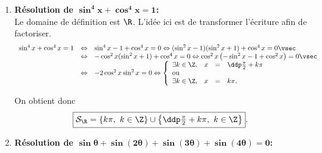 
\begin{correction}  \;
\begin{enumerate}
 \item \textbf{R\'esolution de $\mathbf{ \sin^4{x}+\cos^4{x}=1 }$:}\\
\noindent 
Le domaine de d\'efinition est $\R$. L'id\'ee ici est de transformer l'\'ecriture afin de factoriser. 
$$\begin{array}{lll}
\sin^4{x}+\cos^4{x}=1 &\Leftrightarrow & \sin^4{x}-1+\cos^4{x}=0
\Leftrightarrow  (\sin^2{x}-1)(\sin^2{x}+1)+\cos^4{x}=0\vsec\\
&\Leftrightarrow & -\cos^2{x}(\sin^2{x}+1)+\cos^4{x}=0
\Leftrightarrow 
\cos^2{x}\left(-\sin^2{x}-1+\cos^2{x} \right)=0\vsec\\
&\Leftrightarrow &  -2\cos^2{x}\sin^2{x}=0
\Leftrightarrow \left\lbrace
\begin{array}{llll}
\exists k\in\Z,& x&=&\ddp\frac{\pi}{2}+k\pi\\
\hbox{ou}\\
\exists k\in\Z,& x&=&k\pi.\\
\end{array}\right.\end{array}$$
\begin{minipage}[c]{0.45\textwidth}
 On obtient donc
$$\fbox{$\mathcal{S}_{\R}=\left\lbrace k\pi,\ k\in\Z \right\rbrace\cup\left\lbrace \ddp\frac{\pi}{2}+k\pi,\ k\in\Z \right\rbrace$}.$$
\end{minipage}
\quad \begin{minipage}[c]{0.45\textwidth}
\begin{center}
\end{center}
\end{minipage}
\item \textbf{R\'esolution de $\mathbf{ \sin{\theta}+\sin{(2\theta)}+\sin{(3\theta)}+\sin{(4\theta)}=0  }$:}\\

\end{enumerate}
\end{correction}
